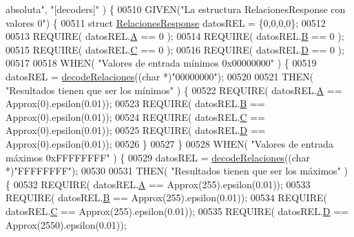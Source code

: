 \begin{DoxyCode}
{{{{       absoluta"}, \textcolor{stringliteral}{"[decoders]"} ) \{
00510     GIVEN(\textcolor{stringliteral}{"La estructura RelacionesResponse con valores 0"}) \{
00511         \textcolor{keyword}{struct }\hyperlink{structRelacionesResponse}{RelacionesResponse} datosREL = \{0,0,0,0\};
00512 
00513         REQUIRE( datosREL.\hyperlink{structRelacionesResponse_a560d1e6af01b999625b467ef3f858181}{A} == 0 );
00514         REQUIRE( datosREL.\hyperlink{structRelacionesResponse_a1216f6019af393dd85853f352533ed9d}{B} == 0 );
00515         REQUIRE( datosREL.\hyperlink{structRelacionesResponse_a37feda02f128b77f4f2d61cabcddc9e7}{C} == 0 );
00516         REQUIRE( datosREL.\hyperlink{structRelacionesResponse_ab76f55b12df3754a9bb5b102a1c06cbc}{D} == 0 );
00517 
00518         WHEN( \textcolor{stringliteral}{"Valores de entrada mínimos 0x00000000"} ) \{
00519             datosREL = \hyperlink{decoders_8cpp_a88d7079325bf81705583d9f2101cfa15}{decodeRelaciones}((\textcolor{keywordtype}{char} *)\textcolor{stringliteral}{"00000000"});
00520 
00521             THEN( \textcolor{stringliteral}{"Resultados tienen que ser los mínimos"} ) \{
00522                 REQUIRE( datosREL.\hyperlink{structRelacionesResponse_a560d1e6af01b999625b467ef3f858181}{A} == Approx(0).epsilon(0.01));
00523                 REQUIRE( datosREL.\hyperlink{structRelacionesResponse_a1216f6019af393dd85853f352533ed9d}{B} == Approx(0).epsilon(0.01));
00524                 REQUIRE( datosREL.\hyperlink{structRelacionesResponse_a37feda02f128b77f4f2d61cabcddc9e7}{C} == Approx(0).epsilon(0.01));
00525                 REQUIRE( datosREL.\hyperlink{structRelacionesResponse_ab76f55b12df3754a9bb5b102a1c06cbc}{D} == Approx(0).epsilon(0.01));
00526             \}
00527         \}
00528         WHEN( \textcolor{stringliteral}{"Valores de entrada máximos 0xFFFFFFFF"} ) \{
00529             datosREL = \hyperlink{decoders_8cpp_a88d7079325bf81705583d9f2101cfa15}{decodeRelaciones}((\textcolor{keywordtype}{char} *)\textcolor{stringliteral}{"FFFFFFFF"});
00530 
00531             THEN( \textcolor{stringliteral}{"Resultados tienen que ser los máximos"} ) \{
00532                 REQUIRE( datosREL.\hyperlink{structRelacionesResponse_a560d1e6af01b999625b467ef3f858181}{A} == Approx(255).epsilon(0.01));
00533                 REQUIRE( datosREL.\hyperlink{structRelacionesResponse_a1216f6019af393dd85853f352533ed9d}{B} == Approx(255).epsilon(0.01));
00534                 REQUIRE( datosREL.\hyperlink{structRelacionesResponse_a37feda02f128b77f4f2d61cabcddc9e7}{C} == Approx(255).epsilon(0.01));
00535                 REQUIRE( datosREL.\hyperlink{structRelacionesResponse_ab76f55b12df3754a9bb5b102a1c06cbc}{D} == Approx(2550).epsilon(0.01));
}}}
\end{DoxyCode}
